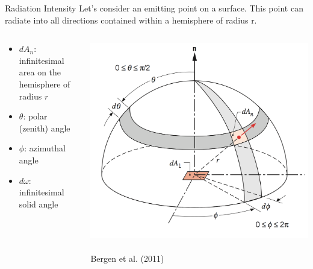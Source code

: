\begin{frame}{Radiation Intensity}
Let’s consider an emitting point on a surface. This point can radiate into all directions contained within a hemisphere of radius r. 

\begin{columns}[T]
    \begin{column}{.5\textwidth}
    \begin{minipage}[c][.5\textheight][c]{\linewidth}
    \begin{itemize}
    \item $dA_n$: infinitesimal area on the hemisphere of radius $r$
	\item $\theta$: polar (zenith) angle
	\item $\phi$: azimuthal angle
	\item $d\omega$: infinitesimal solid angle 
	\end{itemize}  
      \end{minipage}
    \end{column}
    \begin{column}{.5\textwidth}
    \includegraphics[width=1\textwidth]{fig12.png}
	\centering \tiny~\\Bergen et al. (2011)
    \end{column}
  \end{columns} 

\end{frame}


